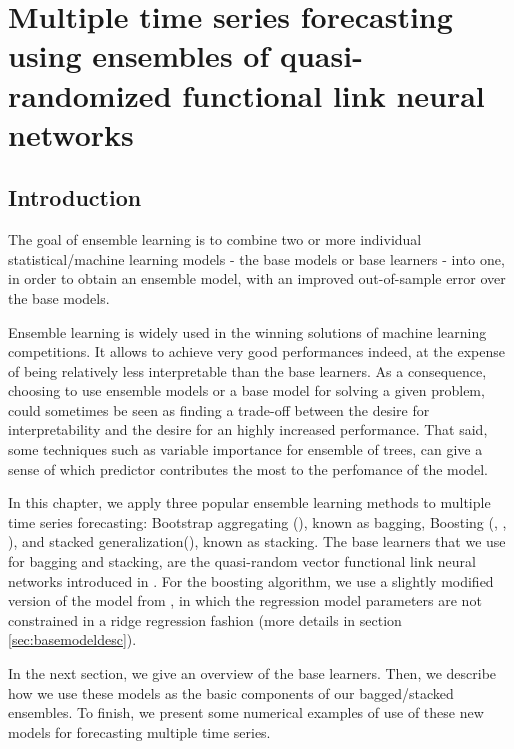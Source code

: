 %
\chapter{Multiple time series forecasting using ensembles of quasi-randomized functional link neural networks}
\label{sec:rvfl_ensembles}

\section{Introduction}

The goal of ensemble learning is to combine two or more individual statistical/machine learning models - the base models or base learners - into one, in order to obtain an ensemble model, with an improved out-of-sample error over the base models.

\medskip

Ensemble learning is widely used in the winning solutions of machine learning competitions. It allows to achieve very good performances indeed, at the expense of being relatively less interpretable than the base learners. As a consequence, choosing to use ensemble models or a base model for solving a given problem, could sometimes be seen as finding a trade-off between the desire for interpretability and the desire for an highly increased performance. That said, some techniques such as variable importance for ensemble of trees, can give a sense of which predictor contributes the most to the perfomance of the model.

\medskip

In this chapter, we apply three popular ensemble learning methods to multiple time series forecasting: Bootstrap aggregating (\cite{breiman1996bagging}), known as bagging, Boosting (\cite{friedman2001greedy}, \cite{buhlmann2003boosting}, \cite{hothorn2010model}), and stacked generalization(\cite{wolpert1992stacked}), known as stacking. The base learners that we use for bagging and stacking, are the quasi-random vector functional link neural networks introduced in \cite{moudiki2018multiple}. For the boosting algorithm, we use a slightly modified version of the model from \cite{moudiki2018multiple}, in which the regression model parameters are not constrained in a ridge regression fashion (more details in section \ref{sec:basemodeldesc}).  

\medskip

In the next section, we give an overview of the base learners. Then, we describe how we use these models as the basic components of our bagged/stacked ensembles. To finish, we present some numerical examples of use of these new models for forecasting multiple time series.

